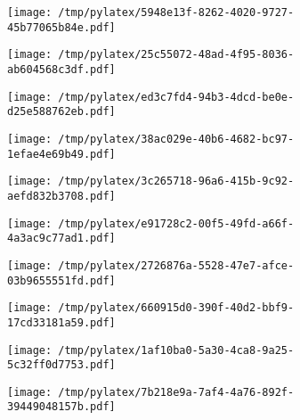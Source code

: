\documentclass{article}
\begin{document}
\begin{figure}[htbp]
\begin{subfigure}[b]{.3\linewidth}
\texttt{[image: /tmp/pylatex/5948e13f-8262-4020-9727-45b77065b84e.pdf]}
\end{subfigure}
\begin{subfigure}[b]{.3\linewidth}
\texttt{[image: /tmp/pylatex/25c55072-48ad-4f95-8036-ab604568c3df.pdf]}
\end{subfigure}
\begin{subfigure}[b]{.3\linewidth}
\texttt{[image: /tmp/pylatex/ed3c7fd4-94b3-4dcd-be0e-d25e588762eb.pdf]}
\end{subfigure}
\begin{subfigure}[b]{.3\linewidth}
\texttt{[image: /tmp/pylatex/38ac029e-40b6-4682-bc97-1efae4e69b49.pdf]}
\end{subfigure}
\begin{subfigure}[b]{.3\linewidth}
\texttt{[image: /tmp/pylatex/3c265718-96a6-415b-9c92-aefd832b3708.pdf]}
\end{subfigure}
\begin{subfigure}[b]{.3\linewidth}
\texttt{[image: /tmp/pylatex/e91728c2-00f5-49fd-a66f-4a3ac9c77ad1.pdf]}
\end{subfigure}
\begin{subfigure}[b]{.3\linewidth}
\texttt{[image: /tmp/pylatex/2726876a-5528-47e7-afce-03b9655551fd.pdf]}
\end{subfigure}
\begin{subfigure}[b]{.3\linewidth}
\texttt{[image: /tmp/pylatex/660915d0-390f-40d2-bbf9-17cd33181a59.pdf]}
\end{subfigure}
\begin{subfigure}[b]{.3\linewidth}
\texttt{[image: /tmp/pylatex/1af10ba0-5a30-4ca8-9a25-5c32ff0d7753.pdf]}
\end{subfigure}
\begin{subfigure}[b]{.3\linewidth}
\texttt{[image: /tmp/pylatex/7b218e9a-7af4-4a76-892f-39449048157b.pdf]}
\end{subfigure}
\end{figure}
\end{document}
